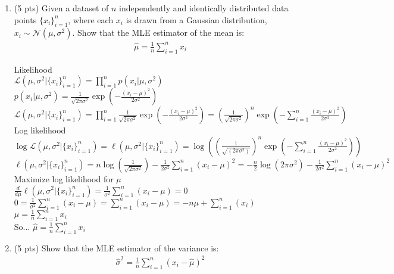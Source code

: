 \documentclass[11pt]{article}
\begin{document}
\begin{enumerate}
\item (5 pts) Given a dataset of 
$n$ independently and identically distributed data points $\{x_i\}_{i=1}^n$, where each $x_i$ is drawn from a Gaussian distribution, $x_i\sim \mathcal{N}(\mu, \sigma^2)$. Show that the MLE estimator of the mean is:
\begin{align}
& \hat{\mu}=\frac{1}{n} \sum_{i=1}^n x_i 
\end{align}
\begin{answertext}{9cm}{}

Likelihood\\
$\mathcal{L}(\mu, \sigma^2 | \{x_i\}_{i=1}^{n}) = \prod_{i=1}^{n} p(x_i | \mu, \sigma^2)$\\
$p(x_i | \mu, \sigma^2) = \frac{1}{\sqrt{2\pi\sigma^2}} \exp({-\frac{(x_i-\mu)^2}{2\sigma^2}})$\\
$\mathcal{L}(\mu, \sigma^2 | \{x_i\}_{i=1}^{n}) = \prod_{i=1}^{n} \frac{1}{\sqrt{2\pi\sigma^2}} \exp({-\frac{(x_i-\mu)^2}{2\sigma^2}}) = (\frac{1}{\sqrt{2\pi\sigma^2}})^n \exp(-\sum_{i=1}^{n}\frac{(x_i-\mu)^2}{2\sigma^2})$\\

Log likelihood\\
$\log{\mathcal{L}(\mu, \sigma^2 | \{x_i\}_{i=1}^{n})} = \ell(\mu, \sigma^2 | \{x_i\}_{i=1}^{n}) = \log((\frac{1}{\sqrt{(2\pi\sigma^2)}})^n \exp(-\sum_{i=1}^{n}\frac{(x_i-\mu)^2}{2\sigma^2}))$\\
$\ell(\mu, \sigma^2 | \{x_i\}_{i=1}^{n}) = n\log(\frac{1}{\sqrt{2\pi\sigma^2}}) - \frac{1}{2\sigma^2} \sum_{i=1}^{n}(x_i-\mu)^2 = -\frac{n}{2}\log(2\pi\sigma^2) - \frac{1}{2\sigma^2}\sum_{i=1}^{n}(x_i-\mu)^2$\\

Maximize log likelihood for $\mu$\\
$\frac{d}{d\mu} \ell(\mu, \sigma^2 | \{x_i\}_{i=1}^{n}) = \frac{1}{\sigma^2}\sum_{i=1}^{n}(x_i-\mu) = 0$\\
$0 = \frac{1}{\sigma^2}\sum_{i=1}^{n}(x_i-\mu) = \sum_{i=1}^{n}(x_i-\mu) = -n\mu + \sum_{i=1}^{n}(x_i)$\\
$\mu = \frac{1}{n}\sum_{i=1}^{n}x_i$\\

So...
$\hat{\mu} = \frac{1}{n}\sum_{i=1}^{n}x_i$

\end{answertext} 
\newpage
\item (5 pts) Show that the MLE estimator of the variance is: 
\begin{align}
& \hat{\sigma}^2=\frac{1}{n} \sum_{i=1}^n\left(x_i-\widehat{\mu}\right)^2
\end{align}
\begin{answertext}{9cm}{}


\end{answertext}
\end{enumerate}
\end{document}
